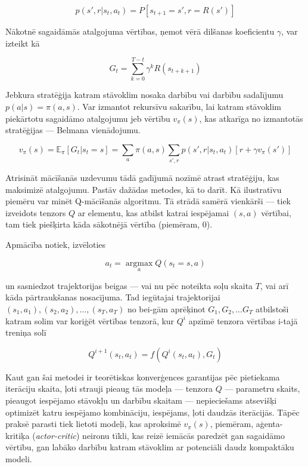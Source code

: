 \documentclass[12pt, a4paper]{article}
\numberwithin{equation}{section} %
\begin{document}
\begin{equation}
    p(s', r \vert s_t, a_t) = P[s_{t+1}=s', r=R(s')]
\end{equation}

Nākotnē sagaidāmās atalgojuma vērtības, ņemot vērā dilšanas koeficientu $\gamma$,  var izteikt kā

\begin{equation}
    G_t = \sum_{k=0}^{T-t} \gamma^k R(s_{t+k+1})
\end{equation}

Jebkura stratēģija katram stāvoklim nosaka darbību vai darbību sadalījumu $p(a \vert s) = \pi(a,s)$. Var izmantot rekursīvu sakarību, lai katram stāvoklim piekārtotu sagaidāmo atalgojumu jeb vērtību $v_{\pi}(s)$, kas atkarīga no izmantotās stratēģijas --- Belmana vienādojumu.

\begin{equation}
    v_{\pi}(s) = \mathbb{E}_{\pi}[G_t \vert s_t = s] = \sum_{a}\pi(a,s)\sum_{s', r}p(s', r \vert s_t, a_t)[r + \gamma v_{\pi}(s')]
\end{equation}

Atrisināt mācīšanās uzdevumu tādā gadījumā nozīmē atrast stratēģiju, kas maksimizē atalgojumu. Pastāv dažādas metodes, kā to darīt. Kā ilustratīvu piemēru var minēt Q-mācīšanās algoritmu. Tā strādā samērā vienkārši --- tiek izveidots tenzors $Q$ ar elementu, kas atbilst katrai iespējamai $(s,a)$ vērtībai, tam tiek piešķirta kāda sākotnējā vērtība (piemēram, 0). 

Apmācība notiek, izvēloties

\begin{equation}
    a_t = \operatorname*{argmax}_a Q(s_t = s, a)
\end{equation}

un sasniedzot trajektorijas beigas --- vai nu pēc noteikta soļu skaita $T$, vai arī kāda pārtraukšanas nosacījuma. Tad iegūtajai trajektorijai $(s_1, a_1), (s_2, a_2), ..., (s_T, a_T)$ no bei-gām aprēķinot $G_1, G_2, ... G_T$ atbilstoši katram solim var koriģēt vērtības tenzorā, kur $Q^i$ apzīmē tenzora vērtības i-tajā treniņa solī

\begin{equation}
    Q^{i+1}(s_t,a_t)=f(Q^{i}(s_t, a_t), G_t)
\end{equation}

Kaut gan šai metodei ir teorētiskas konverģences garantijas pēc pietiekama iterāciju skaita, ļoti strauji pieaug tās modeļa --- tenzora $Q$ --- parametru skaits, pieaugot iespējamo stāvokļu un darbību skaitam --- nepieciešams atsevišķi optimizēt katru iespējamo kombināciju, iespējams, ļoti daudzās iterācijās. Tāpēc praksē parasti tiek lietoti modeļi, kas aproksimē $v_{\pi}(s)$, piemēram, aģenta-kritiķa (\textit{actor-critic}) neironu tīkli, kas reizē iemācās paredzēt gan sagaidāmo vērtību, gan labāko darbību katram stāvoklim ar potenciāli daudz kompaktāku modeli.
\end{document}
